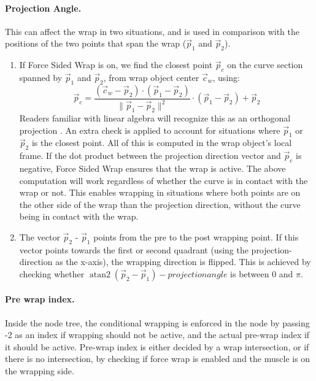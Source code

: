 \documentclass{article}
\DeclareMathOperator{\atantwo}{atan2}
\begin{document}
\paragraph{Projection Angle.} This can affect the wrap in two situations, and is used in comparison with the positions of the two points that span the wrap ($\vec{p}_{1}$ and $\vec{p}_{2}$).

\begin{enumerate}
\item If Force Sided Wrap is on, we find the closest point $\vec{p}_c$ on the curve section spanned by $\vec{p}_{1}$ and $\vec{p}_{2}$, from wrap object center $\vec{c}_w$, using: 
 \begin{equation}
 \vec{p}_c = \frac{(\vec{c}_w - \vec{p}_2) \cdot (\vec{p}_1 - \vec{p}_2)}{\lVert \vec{p}_1 - \vec{p}_2 \rVert^{2}} \cdot (\vec{p}_1 - \vec{p}_2) + \vec{p}_2
 \end{equation}
Readers familiar with linear algebra will recognize this as an orthogonal projection \cite{layLinearAlgebraIts2016}. An extra check is applied to account for situations where $\vec{p}_{1}$ or $\vec{p}_{2}$ is the closest point. All of this is computed in the wrap object's local frame. If the dot product between the projection direction vector and $\vec{p}_c$ is negative, Force Sided Wrap ensures that the wrap is active. The above computation will work regardless of whether the curve is in contact with the wrap or not. This enables wrapping in situations where both points are on the other side of the wrap than the projection direction, without the curve being in contact with the wrap.
 \item The vector $\vec{p}_{2}$ - $\vec{p}_{1}$ points from the pre to the post wrapping point. If this vector points towards the first or second quadrant (using the projection-direction as the x-axis), the wrapping direction is flipped. This is achieved by checking whether $\atantwo{(\vec{p}_{2} - \vec{p}_{1})} - projection angle$ is between 0 and $\pi$.
\end{enumerate}


\paragraph{Pre wrap index.} Inside the node tree, the conditional wrapping is enforced in the node by passing -2 as an index if wrapping should not be active, and the actual pre-wrap index if it should be active. Pre-wrap index is either decided by a wrap intersection, or if there is no intersection, by checking if force wrap is enabled and the muscle is on the wrapping side.
\end{document}
